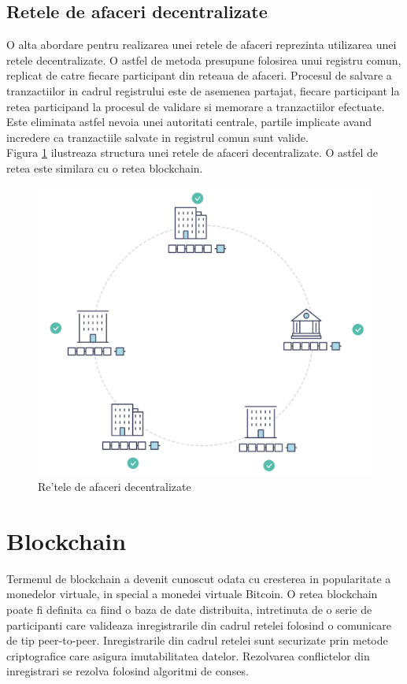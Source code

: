 \documentclass[12pt,a4paper,twoside]{report}
\begin{document}
\subsection{Retele de afaceri decentralizate}
O alta abordare pentru realizarea unei retele de afaceri reprezinta utilizarea unei retele decentralizate. O astfel de metoda presupune folosirea unui registru comun, replicat de catre fiecare participant din reteaua de afaceri. Procesul de salvare a tranzactiilor in cadrul registrului este de asemenea partajat, fiecare participant la retea participand la procesul de validare si memorare a tranzactiilor efectuate. Este eliminata astfel nevoia unei autoritati centrale, partile implicate avand incredere ca tranzactiile salvate in registrul comun sunt valide. \\
Figura \ref{fig:decentralised} ilustreaza structura unei retele de afaceri decentralizate. O astfel de retea este similara cu o retea blockchain.
		\begin{figure}[H]
		\begin{center}
			\includegraphics[scale=0.3]{img/future_net.png}
			\caption{Re'tele de afaceri decentralizate\cite{fabricdoc}}
  			\label{fig:decentralised}
  		\end{center}
  		\end{figure}
  		
\section{Blockchain}
Termenul de blockchain a devenit cunoscut odata cu cresterea in popularitate a monedelor virtuale, in special a monedei virtuale Bitcoin. O retea blockchain poate fi definita ca fiind o baza de date distribuita, intretinuta de o serie de participanti care valideaza inregistrarile din cadrul retelei folosind o comunicare de tip peer-to-peer. Inregistrarile din cadrul retelei sunt securizate prin metode criptografice care asigura imutabilitatea datelor. Rezolvarea conflictelor din inregistrari se rezolva folosind algoritmi de conses.
\end{document}
